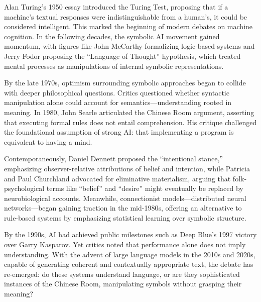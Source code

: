 \begin{historical}
Alan Turing’s 1950 essay introduced the Turing Test, proposing that if a machine’s textual responses were indistinguishable from a human’s, it could be considered intelligent. This marked the beginning of modern debates on machine cognition. In the following decades, the symbolic AI movement gained momentum, with figures like John McCarthy formalizing logic-based systems and Jerry Fodor proposing the “Language of Thought” hypothesis, which treated mental processes as manipulations of internal symbolic representations.

By the late 1970s, optimism surrounding symbolic approaches began to collide with deeper philosophical questions. Critics questioned whether syntactic manipulation alone could account for semantics—understanding rooted in meaning. In 1980, John Searle articulated the Chinese Room argument, asserting that executing formal rules does not entail comprehension. His critique challenged the foundational assumption of strong AI: that implementing a program is equivalent to having a mind.

Contemporaneously, Daniel Dennett proposed the “intentional stance,” emphasizing observer-relative attributions of belief and intention, while Patricia and Paul Churchland advocated for eliminative materialism, arguing that folk-psychological terms like “belief” and “desire” might eventually be replaced by neurobiological accounts. Meanwhile, connectionist models—distributed neural networks—began gaining traction in the mid-1980s, offering an alternative to rule-based systems by emphasizing statistical learning over symbolic structure.

By the 1990s, AI had achieved public milestones such as Deep Blue’s 1997 victory over Garry Kasparov. Yet critics noted that performance alone does not imply understanding. With the advent of large language models in the 2010s and 2020s, capable of generating coherent and contextually appropriate text, the debate has re-emerged: do these systems understand language, or are they sophisticated instances of the Chinese Room, manipulating symbols without grasping their meaning?
\end{historical}
